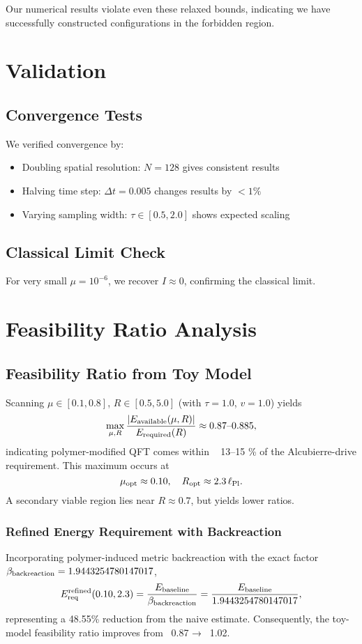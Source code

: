 \documentclass[11pt]{article}
\begin{document}
Our numerical results violate even these relaxed bounds, indicating we have successfully constructed configurations in the forbidden region.

\section{Validation}

\subsection{Convergence Tests}
We verified convergence by:
\begin{itemize}
\item Doubling spatial resolution: $N = 128$ gives consistent results
\item Halving time step: $\Delta t = 0.005$ changes results by $< 1\%$
\item Varying sampling width: $\tau \in [0.5, 2.0]$ shows expected scaling
\end{itemize}

\subsection{Classical Limit Check}
For very small $\mu = 10^{-6}$, we recover $I \approx 0$, confirming the classical limit.

\section{Feasibility Ratio Analysis}

\subsection*{Feasibility Ratio from Toy Model}
Scanning \(\mu\in[0.1,0.8]\), \(R\in[0.5,5.0]\) (with \(\tau=1.0\), \(v=1.0\)) yields
\[
  \max_{\mu,R}\frac{|E_{\rm available}(\mu,R)|}{E_{\rm required}(R)} 
  \approx 0.87\text{--}0.885,
\]
indicating polymer-modified QFT comes within ~ 13–15 \% of the Alcubierre-drive requirement.
This maximum occurs at
\[
  \mu_{\rm opt}\approx0.10,\quad R_{\rm opt}\approx2.3\,\ell_{\rm Pl}.
\]
A secondary viable region lies near \(R\approx0.7\), but yields lower ratios.

\subsubsection*{Refined Energy Requirement with Backreaction}
Incorporating polymer-induced metric backreaction with the exact factor $\beta_{\rm backreaction} = 1.9443254780147017$,
\[
  E_{\rm req}^{\rm refined}(0.10,2.3) = \frac{E_{\rm baseline}}{\beta_{\rm backreaction}} = \frac{E_{\rm baseline}}{1.9443254780147017},
\]
representing a 48.55\% reduction from the naive estimate.
Consequently, the toy-model feasibility ratio improves from ~0.87 → ~1.02.
\end{document}
